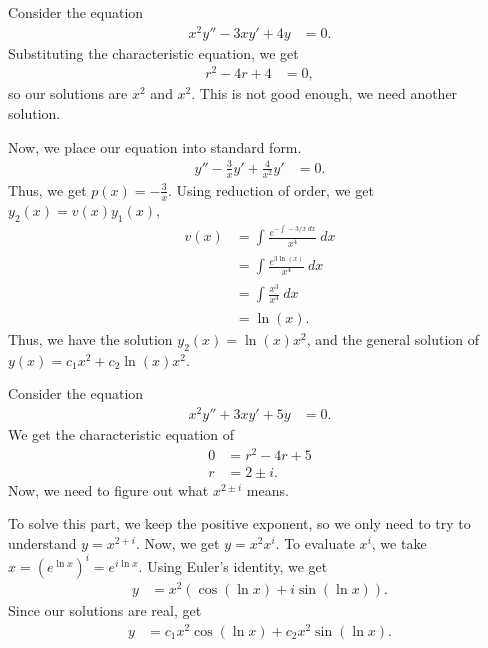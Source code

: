 \documentclass[10pt]{mypackage}
\begin{document}
\begin{example}
  Consider the equation
  \begin{align*}
    x^2y'' - 3xy' + 4y &= 0.
  \end{align*}
  Substituting the characteristic equation, we get
  \begin{align*}
    r^2 - 4r + 4 &= 0,
  \end{align*}
  so our solutions are $x^2$ and $x^2$. This is not good enough, we need another solution.\newline

  Now, we place our equation into standard form.
  \begin{align*}
    y'' - \frac{3}{x}y' + \frac{4}{x^2}y' &= 0.
  \end{align*}
  Thus, we get $p(x) = -\frac{3}{x}$. Using reduction of order, we get $y_2(x) = v(x)y_1(x)$,
  \begin{align*}
    v(x) &= \int_{}^{} \frac{e^{-\int_{}^{} -3/x\:dx}}{x^4}\:dx\\
         &= \int_{}^{} \frac{e^{3\ln(x)}}{x^4}\:dx\\
         &= \int_{}^{} \frac{x^3}{x^4}\:dx\\
         &= \ln(x).
  \end{align*}
  Thus, we have the solution $y_2(x) = \ln(x)x^2$, and the general solution of $y(x) = c_1x^2 + c_2\ln(x)x^2$.
\end{example}
\begin{example}
  Consider the equation
  \begin{align*}
    x^2y'' + 3xy' + 5y &= 0.
  \end{align*}
  We get the characteristic equation of
  \begin{align*}
    0 &= r^2 - 4r + 5\\
    r &= 2\pm i.
  \end{align*}
  Now, we need to figure out what $x^{2\pm i}$ means.\newline

  To solve this part, we keep the positive exponent, so we only need to try to understand $y = x^{2 + i}$. Now, we get $y = x^2 x^i$. To evaluate $x^{i}$, we take $x = \left(e^{\ln x}\right)^{i} = e^{i\ln x}$. Using Euler's identity, we get
  \begin{align*}
    y &= x^2\left(\cos\left(\ln x\right) + i\sin\left(\ln x\right)\right).
  \end{align*}
  Since our solutions are real, get
  \begin{align*}
    y &= c_1x^2\cos\left(\ln x\right) + c_2x^2\sin\left(\ln x\right).
  \end{align*}
\end{example}
\end{document}
